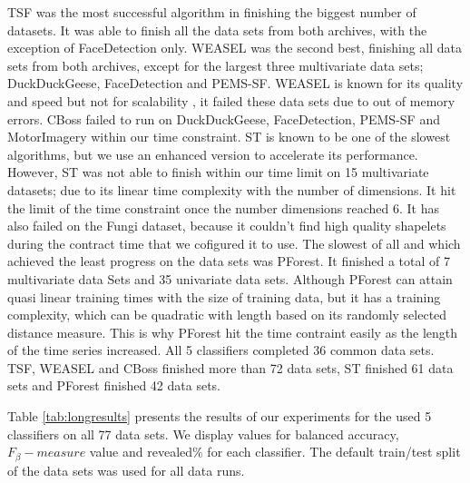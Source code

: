TSF was the most successful algorithm in finishing the biggest number of datasets. It was able to finish all the data sets from both archives, with the exception of FaceDetection only.
WEASEL was the second best, finishing all data sets from both archives, except for the largest three multivariate data sets; DuckDuckGeese, FaceDetection and PEMS-SF.
WEASEL is known for its quality and speed but not for scalability \cite{lucas2019proximity}, it failed these data sets due to out of memory errors.
CBoss failed to run on DuckDuckGeese, FaceDetection, PEMS-SF and MotorImagery within our time constraint.
ST is known to be one of the slowest algorithms, but we use an enhanced version to accelerate its performance. However, ST was not able to finish within our time limit on 15 multivariate datasets; due to its linear time complexity with the number of dimensions. It hit the limit of the time constraint once the number dimensions reached 6.
It has also failed on the Fungi dataset, because it couldn't find high quality shapelets during the contract time that we cofigured it to use.
The slowest of all and which achieved the least progress on the data sets was PForest. It finished a total of 7 multivariate data Sets and 35 univariate data sets.
Although PForest can attain quasi linear training times with the size of training data, but it has a training complexity, which can be quadratic with length based on its randomly selected distance measure.
This is why PForest hit the time contraint easily as the length of the time series increased.
All 5 classifiers completed 36 common data sets. TSF, WEASEL and CBoss finished more than 72 data sets, ST finished 61 data sets and PForest finished 42 data sets.

Table \ref{tab:longresults} presents the results of our experiments for the used 5 classifiers on all 77 data sets.
We display values for balanced accuracy, $F_{\beta}-measure$ value and revealed\% for each classifier.
The default train/test split of the data sets was used for all data runs.

